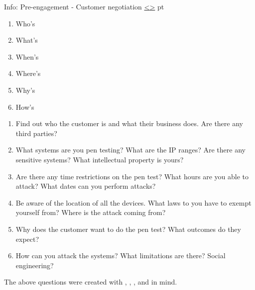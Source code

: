 \documentclass[12pt]{extarticle}
\newenvironment{instructionblock}{\Large\bgroup}{\egroup}
\newcounter{next}
\newcounter{prev}
\begin{document}
\pagebreak
{}
\begin{slide}{Info: Pre-engagement - Customer negotiation}
{\hyperref[slide \theprev]{\textless}\hyperref[slide \thenext]{\textgreater}}
	 pt
	\begin{instructionblock}
		\begin{enumerate}
            \item Who's
            \item What's
            \item When's
            \item Where's
            \item Why's
            \item How's
		\end{enumerate}
	\end{instructionblock}
\end{slide}
\label{Q1}
\begin{enumerate}
\item Find out who the customer is and what their business does. Are there any third parties?
\item What systems are you pen testing? What are the IP ranges? Are there any sensitive systems? What intellectual property is yours?
\item Are there any time restrictions on the pen test? What hours are you able to attack? What dates can you perform attacks?
\item Be aware of the location of all the devices. What laws to you have to exempt yourself from? Where is the attack coming from?
\item Why does the customer want to do the pen test? What outcomes do they expect?
\item How can you attack the systems? What limitations are there? Social engineering?
\end{enumerate}
\begin{small}
	The above questions were created with \cite[Chapter 0]{Ref:Weidman}, \cite{Ref:Sample1}, \cite{Ref:Sample2}, and \cite{Ref:Legal1} in mind.
\end{small}
\end{document}

